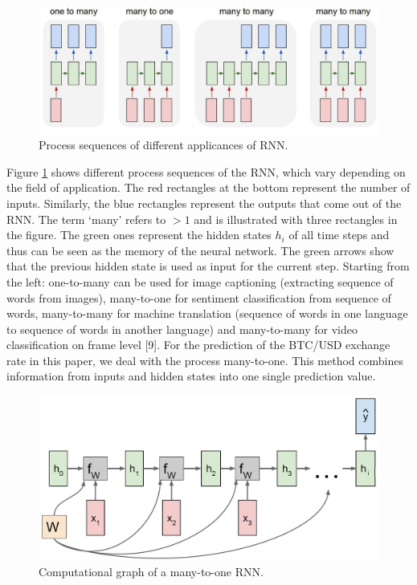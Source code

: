 \documentclass[
]{article}
\begin{document}
\begin{figure}

{\centering \includegraphics[width=0.8\linewidth]{images/RNN} 

}

\caption{Process sequences of different applicances of RNN.}\label{fig:RNN}
\end{figure}

Figure \ref{fig:RNN} shows different process sequences of the RNN, which
vary depending on the field of application. The red rectangles at the
bottom represent the number of inputs. Similarly, the blue rectangles
represent the outputs that come out of the RNN. The term `many' refers
to \(>1\) and is illustrated with three rectangles in the figure. The
green ones represent the hidden states \(h_i\) of all time steps and
thus can be seen as the memory of the neural network. The green arrows
show that the previous hidden state is used as input for the current
step. Starting from the left: one-to-many can be used for image
captioning (extracting sequence of words from images), many-to-one for
sentiment classification from sequence of words, many-to-many for
machine translation (sequence of words in one language to sequence of
words in another language) and many-to-many for video classification on
frame level {[}9{]}. For the prediction of the BTC/USD exchange rate in
this paper, we deal with the process many-to-one. This method combines
information from inputs and hidden states into one single prediction
value.

\begin{figure}

{\centering \includegraphics[width=0.7\linewidth]{images/RNN_many_to_one} 

}

\caption{Computational graph of a many-to-one RNN.}\label{fig:RNN_many_to_one}
\end{figure}
\end{document}
